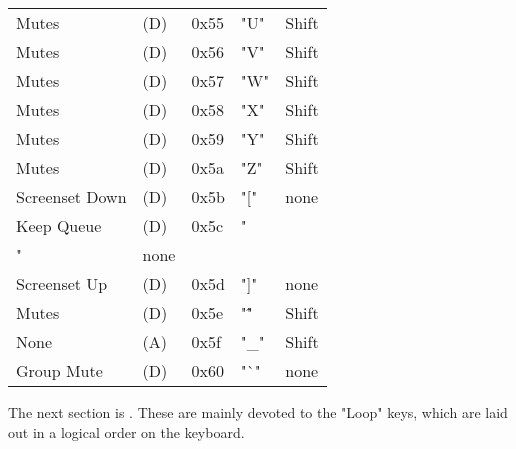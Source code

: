 \begin{table}[htb!]
\begin{tabular}{l l l l l}
        Mutes              & (D)  &  0x55   & "U"          & Shift \\
        Mutes              & (D)  &  0x56   & "V"          & Shift \\
        Mutes              & (D)  &  0x57   & "W"          & Shift \\
        Mutes              & (D)  &  0x58   & "X"          & Shift \\
        Mutes              & (D)  &  0x59   & "Y"          & Shift \\
        Mutes              & (D)  &  0x5a   & "Z"          & Shift \\
        Screenset Down     & (D)  &  0x5b   & "["          & none \\
        Keep Queue         & (D)  &  0x5c   & "\\"         & none \\
        Screenset Up       & (D)  &  0x5d   & "]"          & none \\
        Mutes              & (D)  &  0x5e   & "\^"         & Shift \\
        None               & (A)  &  0x5f   & "\_"         & Shift \\
        Group Mute         & (D)  &  0x60   & "`"          & none \\
      \end{tabular}
   \end{table}

   The next section is .
   These are mainly devoted to the "Loop" keys, which are laid out in
   a logical order on the keyboard.

